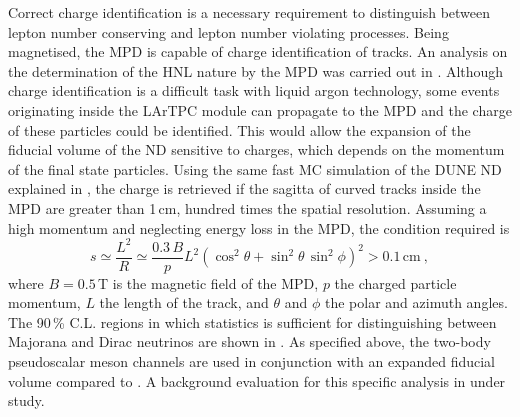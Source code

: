 Correct charge identification is a necessary requirement to distinguish between %
lepton number conserving and lepton number violating processes.
Being magnetised, the MPD is capable of charge identification of tracks.
An analysis on the determination of the HNL nature by the MPD was carried out in .
Although charge identification is a difficult task with liquid argon technology, %
some events originating inside the LArTPC module can propagate to the MPD and the charge of these particles could be identified.
This would allow the expansion of the fiducial volume of the ND sensitive to charges, which depends on the momentum of the final state particles.
Using the same fast MC simulation of the DUNE ND explained in , %
the charge is retrieved if the sagitta of curved tracks inside the MPD are greater than 1\,cm, %
hundred times the spatial resolution.
Assuming a high momentum and neglecting energy loss in the MPD, the condition required is 
\begin{equation}
	s \simeq \frac{L^2}{R} \simeq \frac{0.3\,B}{p} L^2 %
	(\cos^2\theta + \sin^2\theta\, \sin^2\phi)^2 > 0.1\,\text{cm}\ ,
\end{equation}
where $B = 0.5$\,T is the magnetic field of the MPD, $p$ the charged particle momentum, %
$L$ the length of the track, and $\theta$ and $\phi$ the polar and azimuth angles.
The 90\,\% C.L. regions in which statistics is sufficient for distinguishing between Majorana and Dirac neutrinos %
are shown in .
As specified above, the two-body pseudoscalar meson channels are used in conjunction with an expanded fiducial volume %
compared to .
A background evaluation for this specific analysis in under study.
